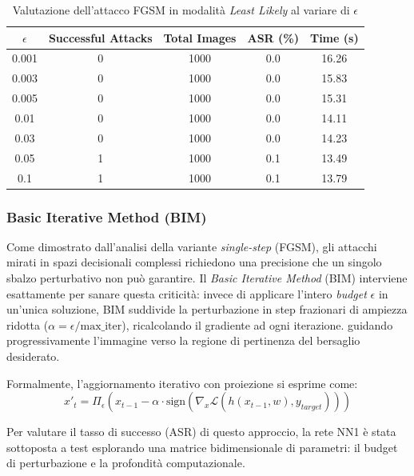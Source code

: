 \documentclass[a4paper, 12pt]{article}
\begin{document}
\begin{table}[H]
    \centering
    \begin{tabular}{ccccc}
        \toprule
        \textbf{$\epsilon$} & \textbf{Successful Attacks} & \textbf{Total Images} & \textbf{ASR (\%)} & \textbf{Time (s)} \\
        \midrule
        0.001 & 0  & 1000 & 0.0 & 16.26 \\
        0.003 & 0  & 1000 & 0.0 & 15.83 \\
        0.005 & 0  & 1000 & 0.0 & 15.31 \\
        0.01  & 0  & 1000 & 0.0 & 14.11 \\
        0.03  & 0  & 1000 & 0.0 & 14.23 \\
        0.05  & 1  & 1000 & 0.1 & 13.49 \\
        0.1   & 1  & 1000 & 0.1 & 13.79 \\
        \bottomrule
    \end{tabular}
    \caption{Valutazione dell'attacco FGSM in modalità \textit{Least Likely} al variare di $\epsilon$}
    \label{tab:FGSM_targeted_least_likely}
\end{table}

\vspace{10pt}


\subsubsection{Basic Iterative Method (BIM)}

Come dimostrato dall'analisi della variante \textit{single-step} (FGSM), gli attacchi mirati in spazi decisionali complessi richiedono una precisione che un singolo sbalzo perturbativo non può garantire. Il \textit{Basic Iterative Method} (BIM) interviene esattamente per sanare questa criticità: invece di applicare l'intero \textit{budget} $\epsilon$ in un'unica soluzione, BIM suddivide la perturbazione in step frazionari di ampiezza ridotta ($\alpha = \epsilon / \text{max\_iter}$), ricalcolando il gradiente ad ogni iterazione. 
guidando progressivamente l'immagine verso la regione di pertinenza del bersaglio desiderato.

Formalmente, l'aggiornamento iterativo con proiezione si esprime come:
$$ x'_t = \Pi_\epsilon \left( x_{t-1} - \alpha \cdot \text{sign}(\nabla_x \mathcal{L}(h(x_{t-1}, w), y_{target})) \right) $$

Per valutare il tasso di successo (ASR) di questo approccio, la rete NN1 è stata sottoposta a test esplorando una matrice bidimensionale di parametri: il budget di perturbazione e la profondità computazionale.
\end{document}
